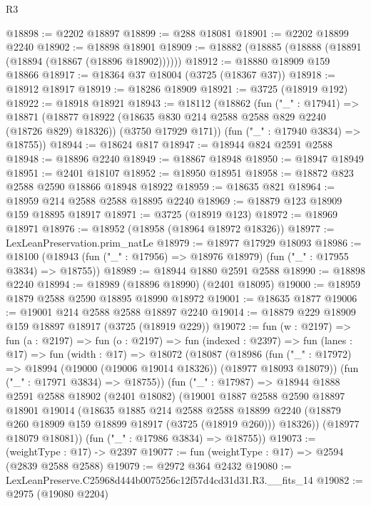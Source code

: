 \begin{lexlean}{R3}
\begin{coremodule}
@18898 := @2202 @18897
@18899 := @288 @18081
@18901 := @2202 @18899 @2240
@18902 := @18898 @18901
@18909 := @18882 (@18885 (@18888 (@18891 (@18894 (@18867 (@18896 @18902))))))
@18912 := @18880 @18909 @159 @18866
@18917 := @18364 @37 @18004 (@3725 (@18367 @37))
@18918 := @18912 @18917
@18919 := @18286 @18909
@18921 := @3725 (@18919 @192)
@18922 := @18918 @18921
@18943 := @18112
    (@18862
      (fun ("_" : @17941) =>
      @18871
        (@18877 @18922 (@18635 @830 @214 @2588 @2588 @829 @2240 (@18726 @829) @18326))
        (@3750 @17929 @171))
      (fun ("_" : @17940 @3834) => @18755))
@18944 := @18624 @817
@18947 := @18944 @824 @2591 @2588
@18948 := @18896 @2240
@18949 := @18867 @18948
@18950 := @18947 @18949
@18951 := @2401 @18107
@18952 := @18950 @18951
@18958 := @18872 @823 @2588 @2590 @18866 @18948 @18922
@18959 := @18635 @821
@18964 := @18959 @214 @2588 @2588 @18895 @2240
@18969 := @18879 @123 @18909 @159 @18895 @18917
@18971 := @3725 (@18919 @123)
@18972 := @18969 @18971
@18976 := @18952 (@18958 (@18964 @18972 @18326))
@18977 := LexLeanPreservation.prim_natLe
@18979 := @18977 @17929 @18093
@18986 := @18100 (@18943 (fun ("_" : @17956) => @18976 @18979) (fun ("_" : @17955 @3834) => @18755))
@18989 := @18944 @1880 @2591 @2588
@18990 := @18898 @2240
@18994 := @18989 (@18896 @18990) (@2401 @18095)
@19000 := @18959 @1879 @2588 @2590 @18895 @18990 @18972
@19001 := @18635 @1877
@19006 := @19001 @214 @2588 @2588 @18897 @2240
@19014 := @18879 @229 @18909 @159 @18897 @18917 (@3725 (@18919 @229))
@19072 := fun (w : @2197) =>
  fun (a : @2197) =>
  fun (o : @2197) =>
  fun (indexed : @2397) =>
  fun (lanes : @17) =>
  fun (width : @17) =>
  @18072
    (@18087
      (@18986
        (fun ("_" : @17972) => @18994 (@19000 (@19006 @19014 @18326)) (@18977 @18093 @18079))
        (fun ("_" : @17971 @3834) => @18755))
      (fun ("_" : @17987) =>
      @18944
        @1888
        @2591
        @2588
        @18902
        (@2401 @18082)
        (@19001
          @1887
          @2588
          @2590
          @18897
          @18901
          @19014
          (@18635
            @1885
            @214
            @2588
            @2588
            @18899
            @2240
            (@18879 @260 @18909 @159 @18899 @18917 (@3725 (@18919 @260)))
            @18326))
        (@18977 @18079 @18081))
      (fun ("_" : @17986 @3834) => @18755))
@19073 := (weightType : @17) -> @2397
@19077 := fun (weightType : @17) => @2594 (@2839 @2588 @2588)
@19079 := @2972 @364 @2432
@19080 := LexLeanPreserve.C25968d444b0075256c12f57d4cd31d31.R3.__fits_14
@19082 := @2975 (@19080 @2204)

\end{coremodule}
\end{lexlean}
